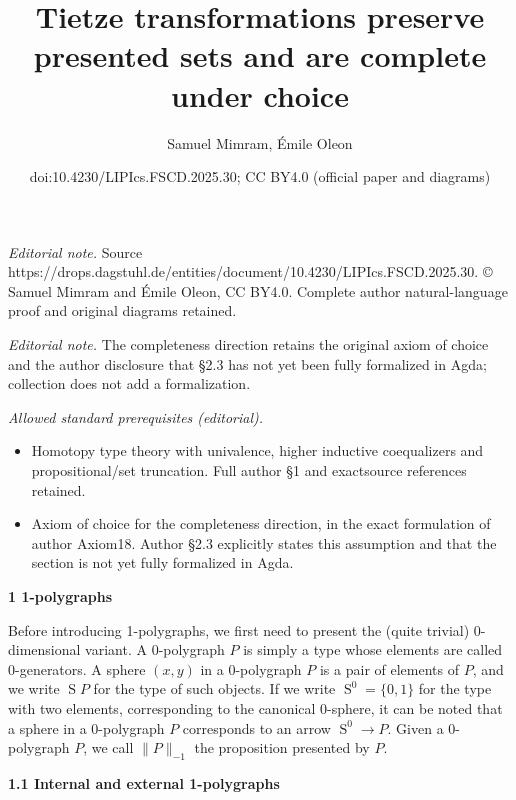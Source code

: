 \documentclass[10pt,a4paper]{amsart}
\title{Tietze transformations preserve presented sets and are complete under choice}
\author{Samuel Mimram, Émile Oleon}
\date{doi:10.4230/LIPIcs.FSCD.2025.30; CC BY4.0 (official paper and diagrams)}
\begin{document}
\maketitle
\noindent\textit{Editorial note.} Source https://drops.dagstuhl.de/entities/document/10.4230/LIPIcs.FSCD.2025.30. © Samuel Mimram and Émile Oleon, CC BY4.0. Complete author natural-language proof and original diagrams retained.\par\medskip
\noindent\textit{Editorial note.} The completeness direction retains the original axiom of choice and the author disclosure that §2.3 has not yet been fully formalized in Agda; collection does not add a formalization.\par\medskip
\noindent\textit{Allowed standard prerequisites (editorial).}\begin{itemize}
\item Homotopy type theory with univalence, higher inductive coequalizers and propositional/set truncation. Full author §1 and exactsource references retained.
\item Axiom of choice for the completeness direction, in the exact formulation of author Axiom18. Author §2.3 explicitly states this assumption and that the section is not yet fully formalized in Agda.
\end{itemize}\medskip
 
\par\medskip\noindent\textbf{1 1-polygraphs}\par
 
 
Before introducing 1-polygraphs, we first need to present the (quite trivial) 0-dimensional variant. A 0-polygraph $P$ is simply a type whose elements are called $0$-generators. A sphere $(x,y)$ in a 0-polygraph $P$ is a pair of elements of $P$, and we write $\operatorname{S}P$ for the type of such objects. If we write $\operatorname{S}^{0}=\{0,1\}$ for the type with two elements, corresponding to the canonical 0-sphere, it can be noted that a sphere in a 0-polygraph $P$ corresponds to an arrow $\operatorname{S}^{0}\to P$. Given a $0$-polygraph $P$, we call $\|P\|_{-1}$ the proposition presented by $P$.\par
 
 
 
\par\medskip\noindent\textbf{1.1 Internal and external 1-polygraphs}\par
 
\end{document}
